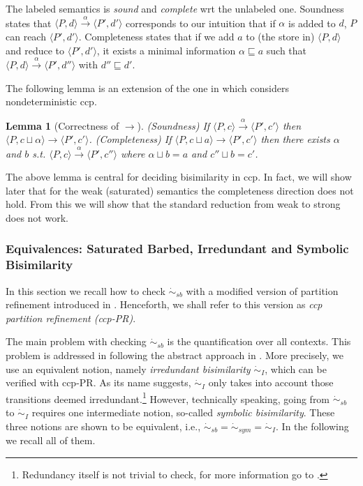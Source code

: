 \documentclass[copyright,creativecommons]{eptcs}
\newcommand{\rrarrow}{\longrightarrow}
\newcommand{\pairccp}[2]{\langle #1,#2 \rangle}
\newcommand{\trans}[1]{\stackrel{#1}{\rrarrow}}
\newcommand{\satstbisim}{\dot{\sim}_{sb}}
\newtheorem{lemma}{Lemma}
\newcommand{\A}{\alpha}
\newcommand{\conf}[2]{\pairccp{#1}{#2}}
\newcommand{\transition}[5]{\conf{#1}{#2} \trans{#3} \conf{#4}{#5}}
\newcommand{\lub}{\sqcup}
\newcommand{\irrbis}{\dot{\sim}_{I}}
\newcommand{\symbis}{\dot{\sim}_{sym}}
\begin{document}
The labeled semantics is \emph{sound} and \emph{complete} wrt the
unlabeled one. Soundness states that $\pairccp{P}{d}
\trans{\alpha}\pairccp{P'}{d'}$ corresponds to our intuition that if
$\alpha$ is added to $d$, $P$ can reach $\pairccp{P'}{d'}$.
Completeness states that if we add $a$ to (the store in)
$\pairccp{P}{d}$ and reduce to $\pairccp{P'}{d'}$, it exists a
minimal information $\alpha \sqsubseteq a$ such that $\pairccp{P}{d}
\trans{\alpha} \pairccp{P'}{d''}$ with $d'' \sqsubseteq d'$.



The following lemma is an extension of the one in \cite{Aristizabal:11:FOSSACS}
which considers nondeterministic ccp. 

\begin{lemma}[Correctness of $\trans{}$]
\label{lem:correctness}
(Soundness) If $\transition{P}{c}{\A}{P'}{c'}$ then $\transition{P}{c \lub \A}{}{P'}{c'}$.
(Completeness) If $\transition{P}{c \lub a}{}{P'}{c'}$ then there exists $\A$ and $b$ s.t. $\transition{P}
{c}{\A}{P'}{c''}$ where $\A \lub b = a$ and $c'' \lub b = c'$.
\end{lemma}







The above lemma  is central for deciding bisimilarity
in ccp. In fact, we will show later that for the weak (saturated) semantics the completeness direction
does not hold. From this we will show that the standard reduction from weak to strong does not work.








\subsubsection{Equivalences: Saturated Barbed, Irredundant and Symbolic Bisimilarity}
In this section we recall how to check $\satstbisim$ with a modified version of partition refinement introduced in \cite{Aristizabal:12:SAC}. Henceforth, we shall refer to this version as \emph{ccp partition refinement (ccp-PR)}.

The main problem with  checking $\satstbisim$ is the quantification over all contexts. This problem is addressed in \cite{Aristizabal:12:SAC}
following the abstract approach in \cite{Bonchi:09:ESOP}. More precisely,
we use an equivalent notion, namely \emph{irredundant bisimilarity} $\irrbis$,  which
can be verified  with ccp-PR. As its name suggests,
$\irrbis$  only takes into account those transitions deemed irredundant.\footnote{Redundancy
itself is not trivial to check, for more information go to \cite{Aristizabal:12:SAC}.}
However, technically speaking, going from $\satstbisim$ to $\irrbis$ requires one
intermediate notion, so-called \emph{symbolic bisimilarity}.  These three notions
are shown to be equivalent, i.e.,   \( \satstbisim = \symbis = \irrbis.\)  In the following we recall all of them.
\end{document}
